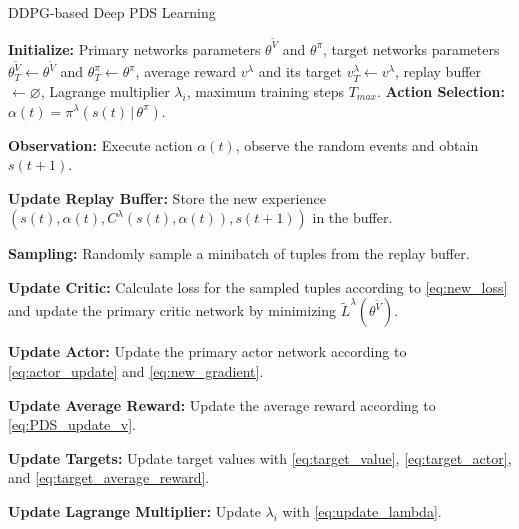 \documentclass[lettersize, journal]{IEEEtran}
\begin{document}
\begin{algorithm}[t]
    \caption{DDPG-based Deep PDS Learning} \label{alg:deep_pds}
    \begin{algorithmic}[1]
        \State \textbf{Initialize:}
        Primary networks parameters $\theta^{\tilde{V}}$ and $\theta^{\pi}$, target networks parameters
        $\theta^{\tilde{V}}_T \leftarrow \theta^{\tilde{V}}$ and $\theta^{\pi}_T \leftarrow \theta^{\pi}$,
        average reward $v^{\lambda}$ and its target $v^{\lambda}_T \leftarrow v^{\lambda}$,
        replay buffer $\gets \varnothing$, Lagrange multiplier $\lambda_i$, maximum training steps $T_{max}$.
        \State \textbf{Action Selection:} $\alpha(t) = \pi^{\lambda}(s(t) \, | \, \theta^{\pi})$.
        \State \parbox[t]{\dimexpr\linewidth-\algorithmicindent}{
            \textbf{Observation:} Execute action $\alpha(t)$, observe the random events and obtain $s(t+1)$.
        \strut}
        \State \parbox[t]{\dimexpr\linewidth-\algorithmicindent}{
            \textbf{Update Replay Buffer:} Store the new experience $(s(t), \alpha(t), 
            C^{\lambda}(s(t), \alpha(t)), s(t+1))$ in the buffer.
        \strut}
        \State \parbox[t]{\dimexpr\linewidth-\algorithmicindent}{
            \textbf{Sampling:} Randomly sample a minibatch of tuples from the replay buffer.
        \strut}
        \State \parbox[t]{\dimexpr\linewidth-\algorithmicindent}{
            \textbf{Update Critic:} Calculate loss for the sampled tuples according to \eqref{eq:new_loss}
            and update the primary critic network by minimizing $\tilde{L}^{\lambda}(\theta^{\tilde{V}})$.
        \strut}
        \State \parbox[t]{\dimexpr\linewidth-\algorithmicindent}{
            \textbf{Update Actor:} Update the primary actor network according to \eqref{eq:actor_update}
            and \eqref{eq:new_gradient}.
        \strut}
        \State \parbox[t]{\dimexpr\linewidth-\algorithmicindent}{
            \textbf{Update Average Reward:} Update the average reward according to \eqref{eq:PDS_update_v}.
        \strut}
        \State \parbox[t]{\dimexpr\linewidth-\algorithmicindent}{
            \textbf{Update Targets:} Update target values with \eqref{eq:target_value}, \eqref{eq:target_actor},
            and \eqref{eq:target_average_reward}.
        \strut}
        \State \parbox[t]{\dimexpr\linewidth-\algorithmicindent}{
            \textbf{Update Lagrange Multiplier:} Update $\lambda_i$ with \eqref{eq:update_lambda}.
        \strut}
        \EndFor
    \end{algorithmic}
\end{algorithm}
\end{document}

